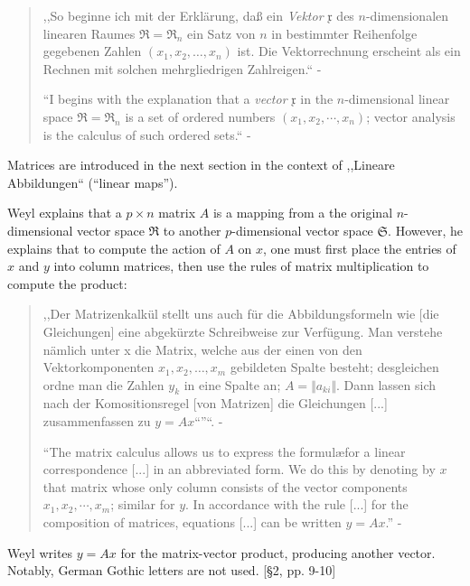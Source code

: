 \begin{quote}
,,So beginne ich mit der Erklärung, daß ein \textit{Vektor} $\mathfrak x$ des $n$-dimensionalen linearen Raumes
$\mathfrak R = \mathfrak R_n$
ein Satz von $n$ in bestimmter Reihenfolge gegebenen Zahlen $(x_1, x_2, \dots, x_n)$
ist. Die Vektorrechnung erscheint als ein Rechnen mit solchen mehrgliedrigen
Zahlreigen.`` - \cite[p. 4]{Weyl1928}

``I begins with the explanation that a \textit{vector} $\mathfrak x$ in the $n$-dimensional
linear space $\mathfrak R = \mathfrak R_n$ is a set of ordered numbers $(x_1, x_2, \cdots, x_n)$;
vector analysis is the calculus of such ordered sets.`` - \cite[p. 1]{Weyl1931}
\end{quote}

Matrices are introduced in the next section in the context of ,,Lineare Abbildungen``
(``linear maps'').

Weyl explains that a $p \times n$ matrix $A$ is a mapping from a the original
$n$-dimensional vector space $\mathfrak R$ to another $p$-dimensional vector space
$\mathfrak S$. However, he explains that to compute the action of $A$ on $x$, one
must first place the entries of $x$ and $y$ into column matrices, then use the
rules of matrix multiplication to compute the product:

\begin{quote}
,,Der Matrizenkalkül stellt uns auch für die Abbildungsformeln wie [die Gleichungen]
 eine abgekürzte Schreibweise zur Verfügung. Man verstehe nämlich unter x die Matrix, welche aus der einen von den Vektorkomponenten $x_1, x_2, \dots, x_m$ gebildeten Spalte besteht; desgleichen ordne man die Zahlen $y_k$ in eine Spalte an; $A = \Vert a_{ki} \Vert$. Dann lassen sich nach der Komositionsregel [von Matrizen] die Gleichungen [...] zusammenfassen zu $y = Ax$``''``. - \cite[p. 10]{Weyl1928}

``The matrix calculus allows us to express the formul\ae for
a linear correspondence [...] in an abbreviated form.
We do this by denoting by $x$ that matrix whose only column consists of the
vector components $x_1, x_2, \cdots, x_m$; similar
for $y$. In accordance with the rule [...] for the composition of
matrices, equations [...] can be written $y = Ax$.'' - \cite[p. 8]{Weyl1931}
\end{quote}

Weyl writes $y = A x$ for the matrix-vector product, producing another vector.
Notably, German Gothic letters are not used. [\S 2, pp. 9-10]

